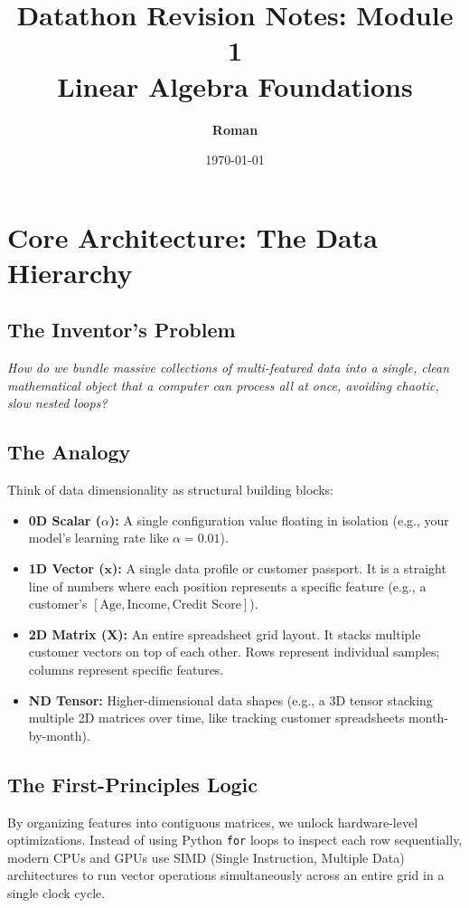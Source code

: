 \documentclass[12pt,a4paper]{article}
\title{\textbf{\color{primary}Datathon Revision Notes: Module 1 \\ Linear Algebra Foundations}}
\author{\textbf{Roman}}
\date{\today}
\begin{document}
\color{darktext}
\maketitle

\section{Core Architecture: The Data Hierarchy}
\subsection*{The Inventor's Problem}
\textit{How do we bundle massive collections of multi-featured data into a single, clean mathematical object that a computer can process all at once, avoiding chaotic, slow nested loops?}

\subsection*{The Analogy}
Think of data dimensionality as structural building blocks:
\begin{itemize}
    \item \textbf{0D Scalar ($\alpha$):} A single configuration value floating in isolation (e.g., your model's learning rate like $\alpha = 0.01$).
    \item \textbf{1D Vector ($\mathbf{x}$):} A single data profile or customer passport. It is a straight line of numbers where each position represents a specific feature (e.g., a customer's $[\text{Age}, \text{Income}, \text{Credit Score}]$).
    \item \textbf{2D Matrix ($\mathbf{X}$):} An entire spreadsheet grid layout. It stacks multiple customer vectors on top of each other. Rows represent individual samples; columns represent specific features.
    \item \textbf{ND Tensor:} Higher-dimensional data shapes (e.g., a 3D tensor stacking multiple 2D matrices over time, like tracking customer spreadsheets month-by-month).
\end{itemize}

\subsection*{The First-Principles Logic}
By organizing features into contiguous matrices, we unlock hardware-level optimizations. Instead of using Python \texttt{for} loops to inspect each row sequentially, modern CPUs and GPUs use SIMD (Single Instruction, Multiple Data) architectures to run vector operations simultaneously across an entire grid in a single clock cycle.
\end{document}
